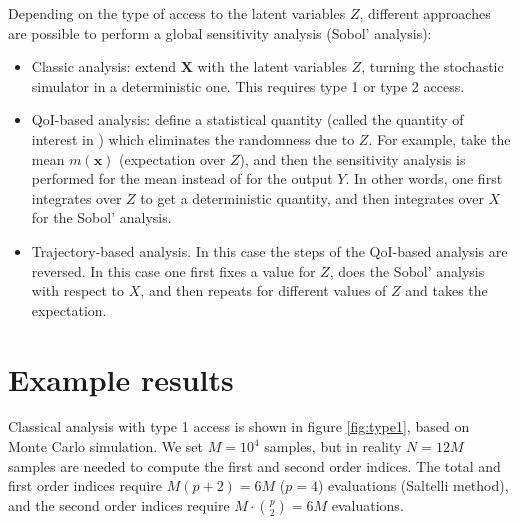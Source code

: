 \documentclass{elsarticle}
\newcommand{\vt}[1]{\bm{#1}}
\begin{document}
Depending on the type of access to the latent variables $Z$, different approaches are possible to perform a global sensitivity analysis (Sobol' analysis):
\begin{itemize}
\item Classic analysis: extend $\vt{X}$ with the latent variables $Z$, turning the stochastic simulator in a deterministic one. This requires type 1 or type 2 access.
\item QoI-based analysis: define a statistical quantity (called the quantity of interest in \cite{Zhu2020a}) which eliminates the randomness due to $Z$. For example, take the mean $m(\vt{x})$ (expectation over $Z$), and then the sensitivity analysis is performed for the mean instead of for the output $Y$. In other words, one first integrates over $Z$ to get a deterministic quantity, and then integrates over $X$ for the Sobol' analysis.
\item Trajectory-based analysis. In this case the steps of the QoI-based analysis are reversed. In this case one first fixes a value for $Z$, does the Sobol' analysis with respect to $X$, and then repeats for different values of $Z$ and takes the expectation.
\end{itemize}


\section{Example results}
Classical analysis with type 1 access is shown in figure \ref{fig:type1}, based on Monte Carlo simulation. We set $M=10^{4}$ samples, but in reality $N =12 M$ samples are needed to compute the first and second order indices. The total and first order indices require $M (p+2) = 6 M$ ($p=4$) evaluations (Saltelli method), and the second order indices require $M \cdot {p \choose 2} = 6 M$ evaluations.
\end{document}
